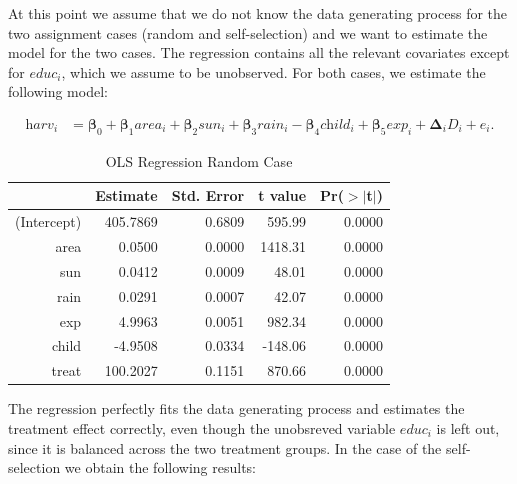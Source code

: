 \begin{enumerate}
At this point we assume that we do not know the data generating process for the two assignment cases (random and self-selection) and we want to estimate the model for the two cases. The regression contains all the relevant covariates except for $\textit{educ}_i$, which we assume to be unobserved. For both cases, we estimate the following model:

\begin{align}
	\label{eq:eq7}
	\textit{harv}_i &= \boldsymbol{\beta}_0 + \boldsymbol{\beta}_1 \textit{area}_i + \boldsymbol{\beta}_2 \textit{sun}_i + \boldsymbol{\beta}_3 \textit{rain}_i - \boldsymbol{\beta}_4 \textit{child}_i + \boldsymbol{\beta}_5 \textit{exp}_i + \boldsymbol{\Delta}_i \textit{D}_i + \textit{e}_i.
\end{align}

\begin{table}[h!]
\centering
\begin{threeparttable}
\caption{OLS Regression Random Case} \label{tab:reg1}
\begin{tabular}{rrrrr}
  \hline
 & Estimate & Std. Error & t value & Pr({$>$}{$|$}t$|$) \\ 
  \hline
(Intercept) & 405.7869 & 0.6809 & 595.99 & 0.0000 \\ 
  area & 0.0500 & 0.0000 & 1418.31 & 0.0000 \\ 
  sun & 0.0412 & 0.0009 & 48.01 & 0.0000 \\ 
  rain & 0.0291 & 0.0007 & 42.07 & 0.0000 \\ 
  exp & 4.9963 & 0.0051 & 982.34 & 0.0000 \\ 
  child & -4.9508 & 0.0334 & -148.06 & 0.0000 \\ 
  treat & 100.2027 & 0.1151 & 870.66 & 0.0000 \\ 
   \hline
\end{tabular}
\end{threeparttable}
\end{table}

The regression perfectly fits the data generating process and estimates the treatment effect correctly, even though the unobsreved variable $\textit{educ}_i$ is left out, since it is balanced across the two treatment groups. In the case of the self-selection we obtain the following results:


\end{enumerate}
